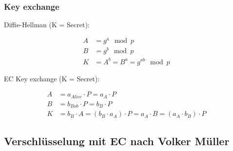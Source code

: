 \documentclass[12pt]{scrartcl}
\begin{document}
\subsubsection{Key exchange}

Diffie-Hellman (K = Secret): 

\begin{align*}
    A &= g^a \mod p \\
    B &= g^b \mod p \\
    K &= A^b = B^a = g^{ab} \mod p    
\end{align*}

EC Key exchange (K = Secret):

\begin{align*}
    A &= a_{Alice} \cdot P = a_A \cdot P\\
    B &= b_{Bob} \cdot P = b_B \cdot P \\
    K &= b_B \cdot A = (b_B \cdot a_A) \cdot P = a_A \cdot B = (a_A \cdot b_B) \cdot P
\end{align*}


\newpage
\subsection{Verschlüsselung mit EC nach Volker Müller}
\end{document}
